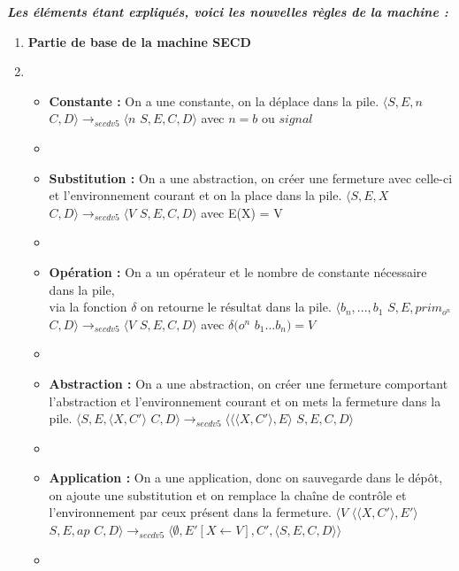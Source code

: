 \documentclass[10pt,a4paper]{article}
\begin{document}
		\textbf{\textit{Les éléments étant expliqués, voici les nouvelles règles de la machine :}}
		\smallbreak
		\begin{enumerate}
			\item[] \textbf{Partie de base de la machine SECD} 
			\item[]
			\begin{itemize}
				\item[] \textbf{Constante :} On a une constante, on la déplace dans la pile.
				\smallbreak
				$\langle S,E,n$ $C,D\rangle 
				\longrightarrow_{secdv5} 
				\langle n$ $S,E,C,D\rangle$ avec $n = b$ ou $signal$
				\item[]
				
				\item[] \textbf{Substitution :} On a une abstraction, on créer une fermeture avec celle-ci et l'environnement courant et on la place dans la pile.
				\smallbreak
				$\langle S,E,X$ $C,D\rangle
				\longrightarrow_{secdv5} 
				\langle V$ $S,E,C,D\rangle$ avec E(X) = V
				\item[]
				
				\item[] \textbf{Opération :} On a un opérateur et le nombre de constante nécessaire dans la pile, \\via la fonction $\delta$ on retourne le résultat dans la pile.
				\smallbreak
				$\langle b_{n},...,b_{1}$ $S,E,prim_{o^{n}}$ $C,D\rangle
				\longrightarrow_{secdv5} 
				\langle V$ $S,E,C,D\rangle$ avec $\delta(o^{n}$ $b_{1}...b_{n}) = V$
				\item[]
				
				\item[]  \textbf{Abstraction :} On a une abstraction, on créer une fermeture comportant l'abstraction et l'environnement courant et on mets la fermeture dans la pile.
				\smallbreak
				$\langle S,E,\langle X,C'\rangle$ $C,D\rangle
				\longrightarrow_{secdv5} 
				\langle \langle\langle X,C'\rangle,E\rangle$ $S,E,C,D\rangle$
				\item[]
				
				\item[]  \textbf{Application :} On a une application, donc on sauvegarde dans le dépôt, on ajoute une substitution et on remplace la chaîne de contrôle et l'environnement par ceux présent dans la fermeture.
				\smallbreak
				$\langle V$ $\langle\langle X,C'\rangle,E'\rangle$ $S,E,ap$ $C,D\rangle
				\longrightarrow_{secdv5} 
				\langle \emptyset,E'[X \leftarrow V],C',\langle S,E,C,D\rangle\rangle$
				\item[] 
				

\end{itemize}
\end{enumerate}
\end{document}
